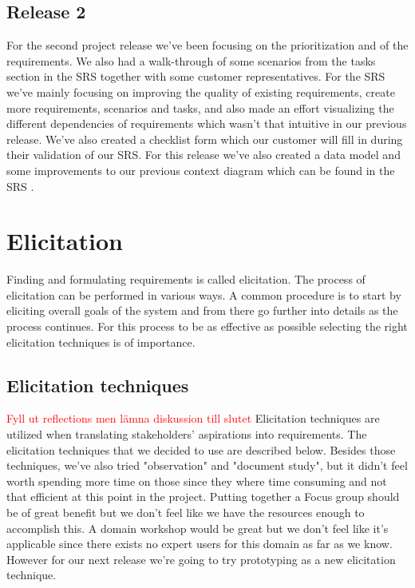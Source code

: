 \documentclass[10pt]{article}
\newcommand\todo[1]{\textcolor{red}{#1}}
\begin{document}
\subsection{Release 2}
For the second project release we've been focusing on the prioritization and of the requirements. We also had a walk-through of some scenarios from the tasks section in the SRS together with some customer representatives. For the SRS we've mainly focusing on improving the quality of existing requirements, create more requirements, scenarios and tasks, and also made an effort visualizing the different dependencies of requirements which wasn't that intuitive in our previous release. We've also created a checklist form which our customer will fill in during their validation of our SRS.
For this release we've also created a data model and some improvements to our previous context diagram which can be found in the SRS \cite{srs}.

\section{Elicitation}
\sloppy
\noindent Finding and formulating requirements is called elicitation. The process of elicitation can be performed in various ways. A common procedure is to start by eliciting overall goals of the system and from there go further into details as the process continues. For this process to be as effective as possible selecting the right elicitation techniques is of importance.

\subsection{Elicitation techniques}
\todo{Fyll ut reflections men lämna diskussion till slutet}
Elicitation techniques are utilized when translating stakeholders' aspirations into requirements.
The elicitation techniques that we decided to use are described below.
Besides those techniques, we've also tried "observation" and "document study", but it didn't feel worth spending more time on those since they where time consuming and not that efficient at this point in the project.
Putting together a Focus group should be of great benefit but we don’t feel like we have the resources enough to accomplish this.
A domain workshop would be great but we don't feel like it's applicable since there exists no expert users for this domain as far as we know.
However for our next release we're going to try prototyping as a new elicitation technique.
\end{document}
